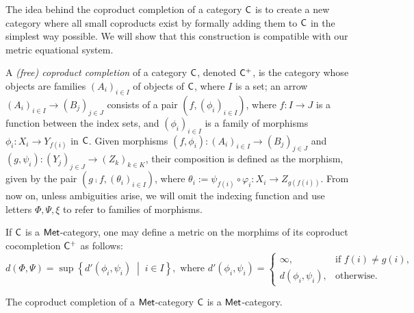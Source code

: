 The idea behind the coproduct completion of a category $\mathsf{C}$ is to create a new category where all small coproducts exist by formally adding them to $\mathsf{C}$  in the simplest way possible. We will show that this construction is compatible with our metric equational system.

\begin{definition}
  A \emph{(free) coproduct completion} of a category \(\mathsf{C}\), denoted $\mathsf{C}^+$, is the category whose objects are families \((A_i)_{i \in I}\) of objects of \(\mathsf{C}\), where \(I\) is a set; an arrow \((A_i)_{i \in I} \to (B_j)_{j \in J}\) consists of a pair \((f, (\phi_i)_{i \in I})\), where \(f : I \to J\) is a function between the index sets, and \((\phi_i)_{i \in I}\) is a family of morphisms \(\phi_i : X_i \to Y_{f(i)}\) in \(\mathsf{C}\). Given morphisms $(f,\phi_i): (A_i)_{i \in I} \to (B_j)_{j \in J}$ and $(g,\psi_i): (Y_j)_{j \in J} \to (Z_k)_{k \in K}$, their composition is defined as the morphism, given by the pair \((g \comp f, (\theta_i)_{i \in I})\), where $ \theta_i := \psi_{f(i)} \circ \varphi_i : X_i \to Z_{g(f(i))}$. From now on, unless ambiguities arise, we will omit the indexing function and use letters $\Phi, \Psi, \xi$ to refer to families of morphisms.
\end{definition}


If $\mathsf{C}$ is a $\mathsf{Met}$-category, one may define a metric on the morphims of its coproduct cocompletion $\mathsf{C}^+$ as follows:
\begin{equation*}
  d(\Phi, \Psi) = \sup \left\{ d'(\phi_i, \psi_i) \;\middle\vert\; i \in I \right\},\text{ where } 
  d'(\phi_i, \psi_i) 
  = 
  \begin{cases}
    \infty, & \text{if } f(i) \neq g(i), \\
    d(\phi_i, \psi_i), & \text{otherwise}.
  \end{cases}
\end{equation*}

\begin{proposition} \label{prop:cop_completion_met}
  The coproduct completion of a $\mathsf{Met}$-category $\mathsf{C}$ is a $\mathsf{Met}$-category.
\end{proposition}

